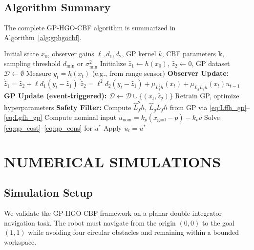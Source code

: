 \documentclass[letterpaper, 10 pt, conference]{ieeeconf}
\begin{document}
\subsection{Algorithm Summary}

The complete GP-HGO-CBF algorithm is summarized in Algorithm~\ref{alg:gphgocbf}.

\begin{algorithm}[t]
\caption{GP-HGO-CBF Safety Filter}
\label{alg:gphgocbf}
\begin{algorithmic}[1]
\REQUIRE Initial state $x_0$, observer gains $\ell, d_1, d_2$, GP kernel $k$, CBF parameters $\bm{k}$, sampling threshold $d_{\min}$ or $\sigma_{\min}^2$
\STATE Initialize $\hat{z}_1 \leftarrow h(x_0)$, $\hat{z}_2 \leftarrow 0$, GP dataset $\mathcal{D} \leftarrow \emptyset$
    \STATE Measure $y_t = h(x_t)$ (e.g., from range sensor)
    \STATE \textbf{Observer Update:}
    \STATE \quad $\dot{\hat{z}}_1 = \hat{z}_2 + \ell d_1 (y_t - \hat{z}_1)$
    \STATE \quad $\dot{\hat{z}}_2 = \ell^2 d_2 (y_t - \hat{z}_1) + \mu_{L_f^2 h}(x_t) + \mu_{L_g L_f h}(x_t) u_{t-1}$
    \STATE \textbf{GP Update (event-triggered):}
        \STATE $\mathcal{D} \leftarrow \mathcal{D} \cup \{(x_t, \hat{z}_2)\}$
        \STATE Retrain GP, optimize hyperparameters
    \ENDIF
    \STATE \textbf{Safety Filter:}
    \STATE Compute $\hat{L}_f^2 h$, $\hat{L}_g L_f h$ from GP via \eqref{eq:Lffh_gp}--\eqref{eq:Lgfh_gp}
    \STATE Compute nominal input $u_{\text{nom}} = k_p(x_{\text{goal}} - p) - k_v v$
    \STATE Solve \eqref{eq:qp_cost}--\eqref{eq:qp_cons} for $u^*$
    \STATE Apply $u_t = u^*$
\ENDFOR
\end{algorithmic}
\end{algorithm}

\section{NUMERICAL SIMULATIONS}
\label{sec:simulations}

\subsection{Simulation Setup}

We validate the GP-HGO-CBF framework on a planar double-integrator navigation task. The robot must navigate from the origin $(0, 0)$ to the goal $(1, 1)$ while avoiding four circular obstacles and remaining within a bounded workspace.
\end{document}
